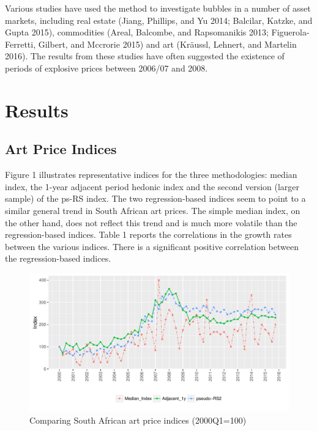 \documentclass[]{elsarticle} %
\makeatletter
\def\maxwidth{\ifdim\Gin@nat@width>\linewidth\linewidth
\else\Gin@nat@width\fi}
\let\Oldincludegraphics\includegraphics
\renewcommand{\includegraphics}[1]{\Oldincludegraphics[width=\maxwidth]{#1}}
\makeatother
\begin{document}
Various studies have used the method to investigate bubbles in a number
of asset markets, including real estate (Jiang, Phillips, and Yu 2014;
Balcilar, Katzke, and Gupta 2015), commodities (Areal, Balcombe, and
Rapsomanikis 2013; Figuerola-Ferretti, Gilbert, and Mccrorie 2015) and
art (Kräussl, Lehnert, and Martelin 2016). The results from these
studies have often suggested the existence of periods of explosive
prices between 2006/07 and 2008.

\section{Results}\label{results}

\subsection{Art Price Indices}\label{art-price-indices}

Figure 1 illustrates representative indices for the three methodologies:
median index, the 1-year adjacent period hedonic index and the second
version (larger sample) of the ps-RS index. The two regression-based
indices seem to point to a similar general trend in South African art
prices. The simple median index, on the other hand, does not reflect
this trend and is much more volatile than the regression-based indices.
Table 1 reports the correlations in the growth rates between the various
indices. There is a significant positive correlation between the
regression-based indices.

\begin{figure}[htbp]
\centering
\includegraphics{Art_Price_Indices_5_J_files/figure-latex/figure10-1.pdf}
\caption{Comparing South African art price indices (2000Q1=100)}
\end{figure}
\end{document}
